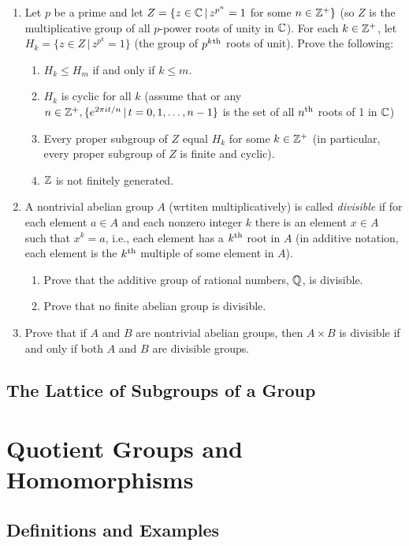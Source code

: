 \documentclass[10pt,a4paper]{report}
\begin{document}
\begin{enumerate}
\item Let $p$ be a prime and let $Z = \{z \in \mathbb{C}\,|\,z^{p^n}=1$ for some $n \in \mathbb{Z}^+\}$ (so $Z$ is the multiplicative group of all $p$-power roots of unity in $\mathbb{C}$).  For each $k \in \mathbb{Z}^+$, let $H_k = \{z \in Z\,|\,z^{p^k}=1\}$ (the group of $p^k\textsuperscript{th}$ roots of unit).  Prove the following:
\begin{enumerate}
	\item $H_k \le H_m$ if and only if $k \le m$.
	\item $H_k$ is cyclic for all $k$ (assume that or any $n \in \mathbb{Z}^+,\{e^{2\pi it/n}\,|\, t=0,1,\dots,n-1\}$ is the set of all $n\textsuperscript{th}$ roots of 1 in $\mathbb{C}$)
	\item Every proper subgroup of $Z$ equal $H_k$ for some $k \in \mathbb{Z}^+$ (in particular, every proper subgroup of $Z$ is finite and cyclic).
	\item $\mathbb{Z}$ is not finitely generated.
\end{enumerate}

\item A nontrivial abelian group $A$ (wrtiten multiplicatively) is called \textit{divisible} if for each element $a \in A$ and each nonzero integer $k$ there is an element $x \in A$ such that $x^k = a$, i.e., each element has a $k\textsuperscript{th}$ root in $A$ (in additive notation, each element is the $k\textsuperscript{th}$ multiple of some element in $A$).
\begin{enumerate}
	\item Prove that the additive group of rational numbers, $\mathbb{Q}$, is divisible.
	\item Prove that no finite abelian group is divisible.
\end{enumerate}

\item Prove that if $A$ and $B$ are nontrivial abelian groups, then $A \times B$ is divisible if and only if both $A$ and $B$ are divisible groups.

\end{enumerate}

\section{The Lattice of Subgroups of a Group}

\chapter{Quotient Groups and Homomorphisms}

\section{Definitions and Examples}
\end{document}
